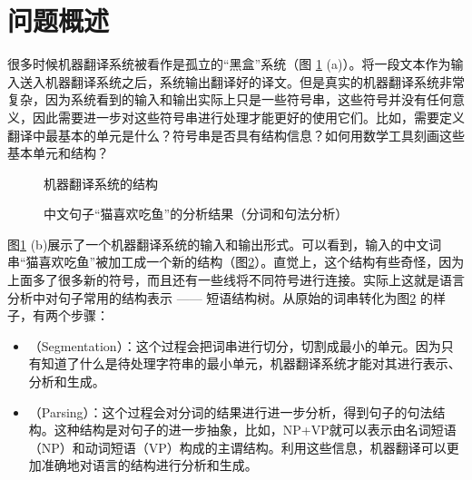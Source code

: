 
\section{问题概述 }

\parinterval 很多时候机器翻译系统被看作是孤立的``黑盒''系统（图 \ref {fig:2-1} (a)）。将一段文本作为输入送入机器翻译系统之后，系统输出翻译好的译文。但是真实的机器翻译系统非常复杂，因为系统看到的输入和输出实际上只是一些符号串，这些符号并没有任何意义，因此需要进一步对这些符号串进行处理才能更好的使用它们。比如，需要定义翻译中最基本的单元是什么？符号串是否具有结构信息？如何用数学工具刻画这些基本单元和结构？

\begin{figure}[htp]
    \centering
 	\subfigure[机器翻译系统被看作一个黑盒] {  }
 	\subfigure[机器翻译系统 = 前/后处理 + 翻译引擎] {}
	\caption{机器翻译系统的结构}
    \label{fig:2-1}
\end{figure}

\begin{figure}[htp]
\centering

\caption{中文句子``猫喜欢吃鱼''的分析结果（分词和句法分析）}
\label{fig:2-2}
\end{figure}

\parinterval 图\ref{fig:2-1} (b)展示了一个机器翻译系统的输入和输出形式。可以看到，输入的中文词串``猫喜欢吃鱼''被加工成一个新的结构（图\ref {fig:2-2}）。直觉上，这个结构有些奇怪，因为上面多了很多新的符号，而且还有一些线将不同符号进行连接。实际上这就是语言分析中对句子常用的结构表示 —— 短语结构树。从原始的词串转化为图\ref {fig:2-2} 的样子，有两个步骤：

\begin{itemize}
\vspace{0.5em}
\item {\small{}}（Segmentation）：这个过程会把词串进行切分，切割成最小的单元。因为只有知道了什么是待处理字符串的最小单元，机器翻译系统才能对其进行表示、分析和生成。
\vspace{0.5em}
\item {\small{}}（Parsing）：这个过程会对分词的结果进行进一步分析，得到句子的句法结构。这种结构是对句子的进一步抽象，比如，NP+VP就可以表示由名词短语（NP）和动词短语（VP）构成的主谓结构。利用这些信息，机器翻译可以更加准确地对语言的结构进行分析和生成。
\vspace{0.5em}
\end{itemize}

